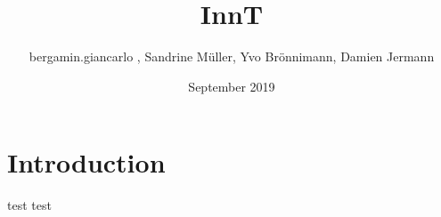 \documentclass{article}
\title{InnT}
\author{bergamin.giancarlo , Sandrine Müller, Yvo Brönnimann, Damien Jermann}
\date{September 2019}
\begin{document}
\maketitle

\section{Introduction}

test test 
\end{document}
